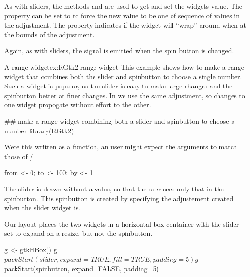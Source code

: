 As with sliders, the methods
 and 
are used to get and set the widgets value. The property
 can be set to  to force the new value
to be one of sequence of values in the adjustment. The 
property indicates if the widget will ``wrap'' around when at the
bounds of the adjustment.

Again, as with sliders, the  signal is emitted when the
spin button is changed. 

\begin{example}{A range widget}{ex:RGtk2-range-widget}
This example shows how to make a range widget that combines both the slider and spinbutton to choose a single number. Such a widget is popular, as the slider is easy to make large changes and the spinbutton better at finer changes. In \GTK\/ we use the same adjustment, so changes to one widget propogate without effort to the other.

\begin{Schunk}
\begin{Sinput}
 ## make a range widget combining both a slider and spinbutton to choose a number
 library(RGtk2)
\end{Sinput}
\end{Schunk}

Were this written as a function, an \R\/ user might expect the
arguments to match those of /
\begin{Schunk}
\begin{Sinput}
 from <- 0; to <- 100; by <- 1
\end{Sinput}
\end{Schunk}

The slider is drawn without a value, so that the user sees only that
in the spinbutton. This spinbutton is created by specifying the
adjustement created when the slider widget is.
\begin{Schunk}
\end{Schunk}
Our layout places the two widgets in a horizontal box container with
the slider set to expand on a resize, but not the spinbutton.
\begin{Schunk}
\begin{Sinput}
 g <- gtkHBox()
 g$packStart(slider, expand=TRUE, fill=TRUE, padding=5)
 g$packStart(spinbutton, expand=FALSE, padding=5)
\end{Sinput}
\end{Schunk}


\end{example}

